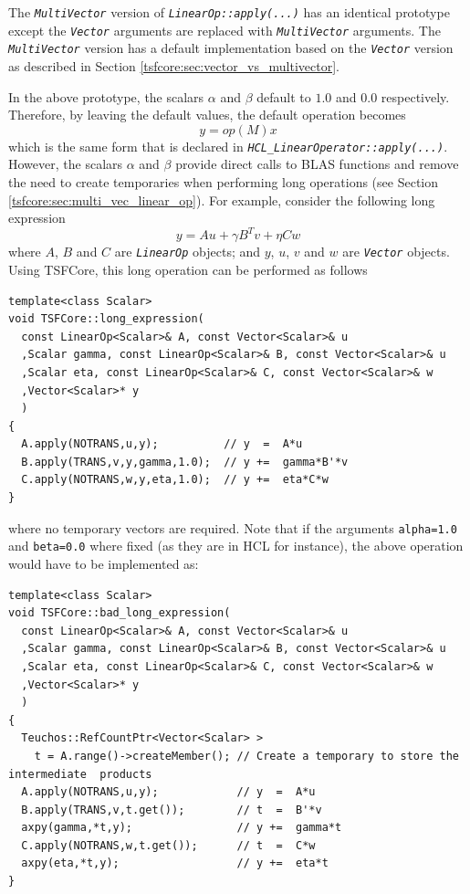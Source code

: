 The {}\texttt{\textit{Multi\-Vector}} version of
{}\texttt{\textit{LinearOp\-::apply(\-...)}} has an identical
prototype except the {}\texttt{\textit{Vector}} arguments are replaced
with {}\texttt{\textit{Multi\-Vector}} arguments.  The
{}\texttt{\textit{Multi\-Vector}} version has a default implementation
based on the {}\texttt{\textit{Vector}} version as described in
Section {}\ref{tsfcore:sec:vector_vs_multivector}.

In the above prototype, the scalars $\alpha$ and $\beta$ default to
$1.0$ and $0.0$ respectively.  Therefore, by leaving the default
values, the default operation becomes
%
\[
y = op(M) x
\]
%
which is the same form that is declared in
{}\texttt{\textit{HCL\-\_Linear\-Operator\-::apply(\-...)}}.  However,
the scalars $\alpha$ and $\beta$ provide direct calls to BLAS
functions and remove the need to create temporaries when performing
long operations (see Section {}\ref{tsfcore:sec:multi_vec_linear_op}).
For example, consider the following long expression
%
\[
y = A u + \gamma B^T v + \eta C w
\]
%
where $A$, $B$ and $C$ are {}\texttt{\textit{LinearOp}} objects; and
$y$, $u$, $v$ and $w$ are {}\texttt{\textit{Vector}} objects.  Using
TSFCore, this long operation can be performed as follows

{\scriptsize\begin{verbatim}
template<class Scalar>
void TSFCore::long_expression(
  const LinearOp<Scalar>& A, const Vector<Scalar>& u
  ,Scalar gamma, const LinearOp<Scalar>& B, const Vector<Scalar>& u
  ,Scalar eta, const LinearOp<Scalar>& C, const Vector<Scalar>& w
  ,Vector<Scalar>* y
  )
{
  A.apply(NOTRANS,u,y);          // y  =  A*u
  B.apply(TRANS,v,y,gamma,1.0);  // y +=  gamma*B'*v
  C.apply(NOTRANS,w,y,eta,1.0);  // y +=  eta*C*w
}
\end{verbatim}}

{}\noindent{}where no temporary vectors are required.  Note that if
the arguments {}\texttt{alpha=1.0} and {}\texttt{beta=0.0} where fixed
(as they are in HCL for instance), the above operation would have to
be implemented as:

{\scriptsize\begin{verbatim}
template<class Scalar>
void TSFCore::bad_long_expression(
  const LinearOp<Scalar>& A, const Vector<Scalar>& u
  ,Scalar gamma, const LinearOp<Scalar>& B, const Vector<Scalar>& u
  ,Scalar eta, const LinearOp<Scalar>& C, const Vector<Scalar>& w
  ,Vector<Scalar>* y
  )
{
  Teuchos::RefCountPtr<Vector<Scalar> >
    t = A.range()->createMember(); // Create a temporary to store the intermediate  products
  A.apply(NOTRANS,u,y);            // y  =  A*u
  B.apply(TRANS,v,t.get());        // t  =  B'*v
  axpy(gamma,*t,y);                // y +=  gamma*t
  C.apply(NOTRANS,w,t.get());      // t  =  C*w
  axpy(eta,*t,y);                  // y +=  eta*t
}
\end{verbatim}}

